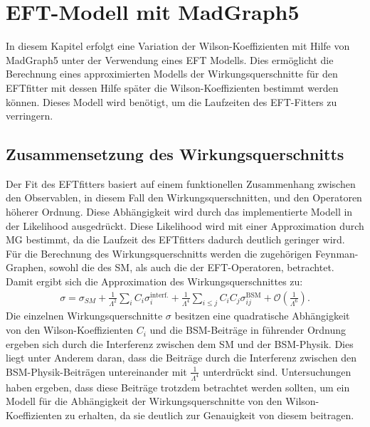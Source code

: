\chapter{EFT-Modell mit MadGraph5}
In diesem Kapitel erfolgt eine Variation der Wilson-Koeffizienten mit Hilfe  von MadGraph5 unter der Verwendung eines EFT Modells. Dies ermöglicht die Berechnung eines approximierten Modells der Wirkungsquerschnitte für den EFTfitter mit dessen Hilfe später die Wilson-Koeffizienten bestimmt werden können. Dieses Modell wird benötigt, um die Laufzeiten des EFT-Fitters zu verringern.

\section{Zusammensetzung des Wirkungsquerschnitts}
Der Fit des EFTfitters basiert auf einem funktionellen Zusammenhang zwischen den Observablen, in diesem Fall den Wirkungsquerschnitten, und den Operatoren höherer Ordnung. Diese Abhängigkeit wird durch das implementierte Modell in der Likelihood ausgedrückt. Diese Likelihood wird mit einer Approximation durch MG bestimmt, da die Laufzeit des EFTfitters dadurch deutlich geringer wird.\\
Für die Berechnung des Wirkungsquerschnitts werden die zugehörigen Feynman-Graphen, sowohl die des SM, als auch die der EFT-Operatoren, betrachtet. Damit ergibt sich die Approximation des Wirkungsquerschnittes zu:
\begin{align}
  \sigma = \sigma_{SM} + \frac{1}{\Lambda^2} \sum_{i} C_i \sigma_i^\text{interf.} + \frac{1}{\Lambda^4} \sum_{i \leq j} C_i C_j \sigma_{ij}^\text{BSM} + \mathcal{O} \left(\frac{1}{\Lambda^6}\right).
\end{align}
Die einzelnen Wirkungsquerschnitte $\sigma$ besitzen eine quadratische Abhängigkeit von den Wilson-Koeffizienten $C_i$ und die BSM-Beiträge in führender Ordnung ergeben sich durch die Interferenz zwischen dem SM und der BSM-Physik. Dies liegt unter Anderem daran, dass die Beiträge durch die Interferenz zwischen den BSM-Physik-Beiträgen untereinander mit $\frac{1}{\Lambda^4}$ unterdrückt sind. Untersuchungen\cite{Wilson-Beiträge} haben ergeben, dass diese Beiträge trotzdem betrachtet werden sollten, um ein Modell für die Abhängigkeit der Wirkungsquerschnitte von den Wilson-Koeffizienten zu erhalten, da sie deutlich zur Genauigkeit von diesem beitragen.

